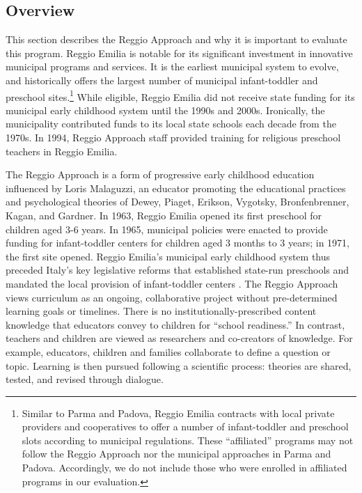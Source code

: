 \subsection{Overview}
This section describes the Reggio Approach and why it is important to evaluate this program. Reggio Emilia is notable for its significant investment in innovative municipal programs and services. It is the earliest municipal system to evolve, and historically offers the largest number of municipal infant-toddler and preschool sites.\footnote{Similar to Parma and Padova, Reggio Emilia contracts with local private providers and cooperatives to offer a number of infant-toddler and preschool slots according to municipal regulations. These ``affiliated'' programs may not follow the Reggio Approach nor the municipal approaches in Parma and Padova. Accordingly, we do not include those who were enrolled in affiliated programs in our evaluation.} While eligible, Reggio Emilia did not receive state funding for its municipal early childhood system until the 1990s and 2000s. Ironically, the municipality contributed funds to its local state schools each decade from the 1970s. In 1994, Reggio Approach staff provided training for religious preschool teachers in Reggio Emilia. 

The Reggio Approach is a form of progressive early childhood education influenced by Loris Malaguzzi, an educator promoting the educational practices and psychological theories of Dewey, Piaget, Erikson, Vygotsky, Bronfenbrenner, Kagan, and Gardner. In 1963, Reggio Emilia opened its first preschool for children aged 3-6 years. In 1965, municipal policies were enacted to provide funding for infant-toddler centers for children aged 3 months to 3 years; in 1971, the first site opened. Reggio Emilia's municipal early childhood system thus preceded Italy's key legislative reforms that established state-run preschools and mandated the local provision of infant-toddler centers \citep{Cagliari-etal-eds_2016_BOOK_Loris-Malaguzzi}. The Reggio Approach views curriculum as an ongoing, collaborative project without pre-determined learning goals or timelines. There is no institutionally-prescribed content knowledge that educators convey to children for ``school readiness.'' In contrast, teachers and children are viewed as researchers and co-creators of knowledge. For example, educators, children and families collaborate to define a question or topic. Learning is then pursued following a scientific process: theories are shared, tested, and revised through dialogue. 


